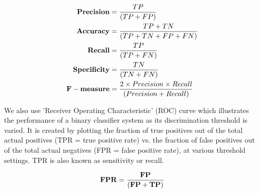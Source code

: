 \begin{equation}\label{eq:formula}
\centering
\begin{aligned}
\bf Precision &= \frac{TP} {(TP + FP)}  \\ \nonumber
\bf Accuracy &= \frac{TP + TN} {(TP + TN + FP + FN)} \\
\bf Recall &= \frac{TP} {(TP + FN)}  \\
\bf Specificity &= \frac{TN} {(TN + FN)} \\
\bf F-measure &= \frac{2 \times Precision \times Recall} {(Precision + Recall)} \\
\end{aligned}
\end{equation}

We also use 'Receiver Operating Characteristic' (ROC) curve which illustrates the performance of a binary classifier system as its discrimination threshold is varied. It is created by plotting the fraction of true positives out of the total actual positives (TPR = true positive rate) vs. the fraction of false positives out of the total actual negatives (FPR = false positive rate), at various threshold settings. TPR is also known as sensitivity or recall.

\[
{\bf FPR = \frac{FP} {(FP + TP)}}
\]

